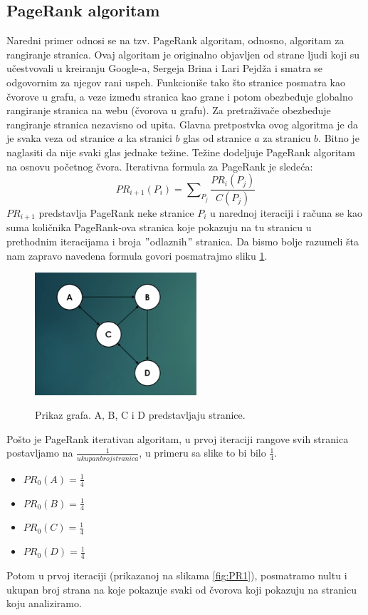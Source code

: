 \documentclass[a4paper]{article}
\begin{document}
\subsection{PageRank algoritam}
Naredni primer odnosi se na tzv. PageRank algoritam, odnosno, algoritam za rangiranje stranica. Ovaj algoritam je originalno objavljen od strane ljudi koji su učestvovali u kreiranju Google-a, Sergeja Brina i Lari Pejdža i smatra se odgovornim za njegov rani uspeh. Funkcioniše tako što stranice posmatra kao čvorove u grafu, a veze između stranica kao grane i potom obezbeđuje globalno rangiranje stranica na webu (čvorova u grafu). Za pretraživače obezbeđuje rangiranje stranica nezavisno od upita. Glavna pretpostvka ovog algoritma je da je svaka veza od stranice $a$ ka stranici $b$ glas od stranice $a$ za stranicu $b$. Bitno je naglasiti da nije svaki glas jednake težine. Težine dodeljuje PageRank algoritam na osnovu početnog čvora. Iterativna formula za PageRank je sledeća:
\begin{equation}
PR_{i+1}(P_i) = \sum\nolimits_{P_j}\frac{PR_i(P_j)}{C(P_j)}
\end{equation}
$PR_{i+1}$ predstavlja PageRank neke stranice $P_i$ u narednoj iteraciji i računa se kao suma količnika PageRank-ova stranica koje pokazuju na tu stranicu u prethodnim iteracijama i broja $"$odlaznih$"$ stranica. Da bismo bolje razumeli šta nam zapravo navedena formula govori posmatrajmo sliku \ref{fig:pr1}. 
\begin{figure}[t]
\includegraphics[width=6cm]{Pictures/pr1.png}
\centering
\label{fig:pr1}
\caption{Prikaz grafa. A, B, C i D predstavljaju stranice.}
\end{figure}


Pošto je PageRank iterativan algoritam, u prvoj iteraciji rangove svih stranica postavljamo na $\frac{1}{ukupanbrojstranica}$, u primeru sa slike to bi bilo $\frac{1}{4}$. 
\begin{itemize}
\item $PR_0(A) = \frac{1}{4}$
\item $PR_0(B) = \frac{1}{4}$
\item $PR_0(C) = \frac{1}{4}$
\item $PR_0(D) = \frac{1}{4}$
\end{itemize}
Potom u prvoj iteraciji (prikazanoj na slikama \ref{fig:PR1}), posmatramo nultu i ukupan broj strana na koje pokazuje svaki od čvorova koji pokazuju na stranicu koju analiziramo.
\end{document}
